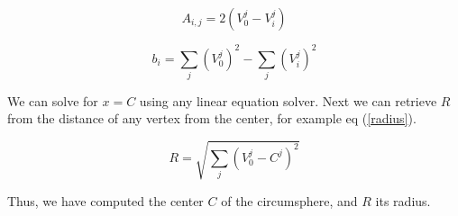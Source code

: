 \documentclass[]{article}
\begin{document}
\begin{equation} \label{a}
A_{i,j} = 2 \left( V_0^j - V_i^j \right)
\end{equation}

\begin{equation} \label{b}
b_{i} = \sum_j \left( V_0^j \right)^2 - \sum_j \left( V_i^j \right)^2
\end{equation}

We can solve for $x = C$ using any linear equation solver. Next we can
retrieve $R$ from the distance of any vertex from the center, for example
eq (\ref{radius}).

\begin{equation} \label{radius}
R = \sqrt{\sum_j \left( V_0^j - C^j \right)^2}
\end{equation}

Thus, we have computed the center $C$ of the circumsphere, and $R$ its radius.
\end{document}

